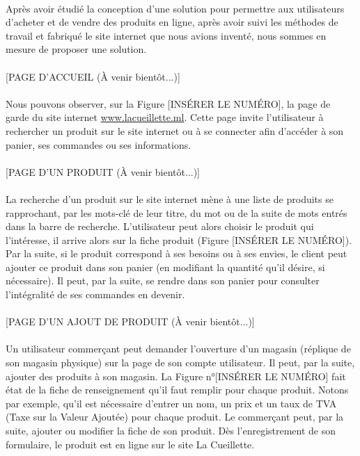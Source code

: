 \documentclass[a4paper, 12pt]{article}
\begin{document}
\paragraph{}Après avoir étudié la conception d’une solution pour permettre aux utilisateurs d’acheter et de vendre des produits en ligne, après avoir suivi les méthodes de travail et fabriqué le site internet que nous avions inventé, nous sommes en mesure de proposer une solution.
\paragraph{}[PAGE D’ACCUEIL (À venir bientôt...)]
\paragraph{}Nous pouvons observer, sur la Figure [INSÉRER LE NUMÉRO], la page de garde du site internet \href{https://www.lacueillette.ml}{www.lacueillette.ml}. Cette page invite l’utilisateur à rechercher un produit sur le site internet ou à se connecter afin d’accéder à son panier, ses commandes ou ses informations.
\paragraph{}[PAGE D’UN PRODUIT (À venir bientôt...)]
\paragraph{}La recherche d’un produit sur le site internet mène à une liste de produits se rapprochant, par les mots-clé de leur titre, du mot ou de la suite de mots entrés dans la barre de recherche. L’utilisateur peut alors choisir le produit qui l’intéresse, il arrive alors sur la fiche produit (Figure [INSÉRER LE NUMÉRO]). Par la suite, si le produit correspond à ses besoins ou à ses envies, le client peut ajouter ce produit dans son panier (en modifiant la quantité qu’il désire, si nécessaire). Il peut, par la suite, se rendre dans son panier pour consulter l’intégralité de ses commandes en devenir.
\paragraph{}[PAGE D’UN AJOUT DE PRODUIT (À venir bientôt...)]
\paragraph{}Un utilisateur commerçant peut demander l’ouverture d’un magasin (réplique de son magasin physique) sur la page de son compte utilisateur. Il peut, par la suite, ajouter des produits à son magasin.  La Figure n°[INSÉRER LE NUMÉRO] fait état de la fiche de renseignement qu’il faut remplir pour chaque produit. Notons par exemple, qu’il est nécessaire d’entrer un nom, un prix et un taux de TVA (Taxe sur la Valeur Ajoutée) pour chaque produit. Le commerçant peut, par la suite, ajouter ou modifier la fiche de son produit. Dès l’enregistrement de son formulaire, le produit est en ligne sur le site La Cueillette.
\end{document}
